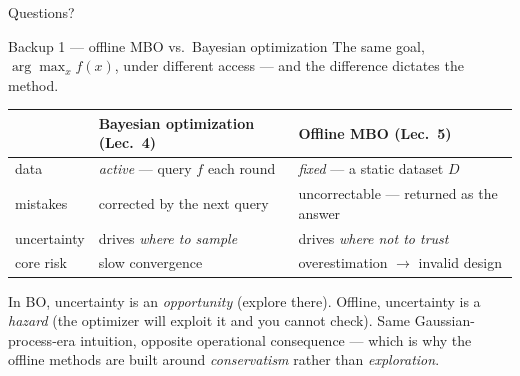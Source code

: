 \documentclass[10pt, aspectratio=169]{beamer}
\begin{document}
\begin{frame}[standout]
Questions?
\end{frame}

\appendix

\begin{frame}{Backup 1 --- offline MBO vs.\ Bayesian optimization}
\footnotesize
The same goal, $\arg\max_x f(x)$, under different access --- and the difference dictates the method.
\medskip
\begin{center}\scriptsize\renewcommand{\arraystretch}{1.4}
\begin{tabular}{l|l|l}
 & \textbf{Bayesian optimization (Lec.\ 4)} & \textbf{Offline MBO (Lec.\ 5)} \\
\hline
data & \emph{active} --- query $f$ each round & \emph{fixed} --- a static dataset $D$ \\
mistakes & corrected by the next query & \alert{uncorrectable} --- returned as the answer \\
uncertainty & drives \emph{where to sample} & drives \emph{where not to trust} \\
core risk & slow convergence & overestimation $\to$ invalid design \\
\end{tabular}
\end{center}
\medskip
In BO, uncertainty is an \emph{opportunity} (explore there). Offline, uncertainty is a \emph{hazard} (the optimizer will exploit it and you cannot check). Same Gaussian-process-era intuition, opposite operational consequence --- which is why the offline methods are built around \emph{conservatism} rather than \emph{exploration}.
\end{frame}
\end{document}
